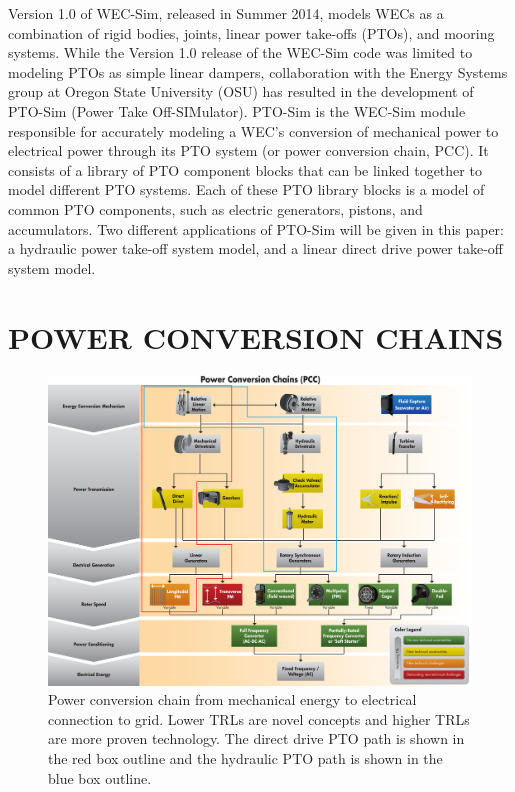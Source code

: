 \documentclass[twocolumn,10pt]{asme2e}
\begin{document}
Version 1.0 of WEC-Sim, released in Summer 2014, models WECs as a combination of rigid bodies, joints, linear power take-offs (PTOs), and mooring systems. While the Version 1.0 release of the WEC-Sim code was limited to modeling PTOs as simple linear dampers, collaboration with the Energy Systems group at Oregon State University (OSU) has resulted in the development of PTO-Sim (Power Take Off-SIMulator). PTO-Sim is the WEC-Sim module responsible for accurately modeling a WEC's conversion of mechanical power to electrical power through its PTO system (or power conversion chain, PCC). It consists of a library of PTO component blocks that can be linked together to model different PTO systems. Each of these PTO library blocks is a model of common PTO components, such as electric generators, pistons, and accumulators. Two different applications of PTO-Sim will be given in this paper: a hydraulic power take-off system model, and  a linear direct drive power take-off system model. 


\section*{POWER CONVERSION CHAINS}

\begin{figure}[t] 
    \centering
    \includegraphics[width=1.95\columnwidth]{Images/PCC_HydDD}
    \caption{Power conversion chain from mechanical energy to electrical connection to grid. Lower TRLs are novel concepts and higher TRLs are more proven technology. The direct drive PTO path is shown in the red box outline and the hydraulic PTO path is shown in the blue box outline.}
    \label{PCC}
    \end{figure}
\end{document}
